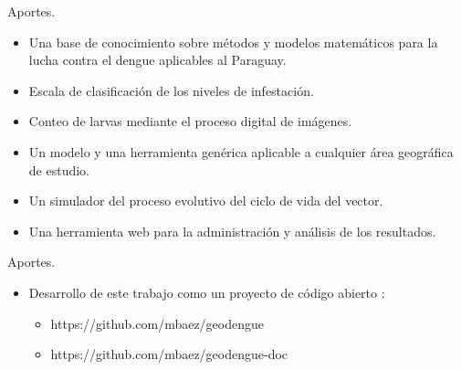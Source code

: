 \begin{frame}[c]{Aportes.}
    \begin{itemize}
        \item Una base de conocimiento sobre métodos y modelos matemáticos para la lucha contra el dengue aplicables al Paraguay.
        \item Escala de clasificación de los niveles de infestación.
        \item Conteo de larvas mediante el proceso digital de imágenes.
        \item Un modelo y una herramienta genérica aplicable a cualquier área geográfica de estudio.
        \item Un simulador del proceso evolutivo del ciclo de vida del vector.
        \item Una herramienta web para la administración y análisis de los resultados.
    \end{itemize}
\end{frame}

\begin{frame}[t]{Aportes.}
    \begin{itemize}
        \item Desarrollo de este trabajo como un proyecto de código abierto :

        \begin{itemize}
            \item https://github.com/mbaez/geodengue
            \item https://github.com/mbaez/geodengue-doc
        \end{itemize}
    \end{itemize}
\end{frame}
